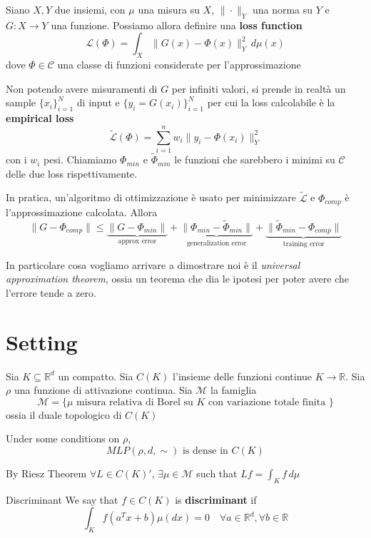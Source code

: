 Siano \(X,Y\) due insiemi, con \(\mu\) una misura su \(X\), \(\|\cdot \|_Y\) una
norma su \(Y\) e \(G:X\to Y\) una funzione. Possiamo allora definire una \textbf{loss function}
\[
  \mathcal{L}{(\Phi)} = \int_X \|G{(x)}-\Phi{(x)}\|^2_Y \,d\mu{(x)}
\]
dove \(\Phi \in \mathcal{C}\) una classe di funzioni considerate per
l'approssimazione

Non potendo avere misuramenti di \(G\) per infiniti valori, si prende in
realtà un sample \(\{x_{i}\}_{i=1} ^{N}\) di input e \(\{y_{i}=G{(x_{i})}\}_{i=1} ^{N}\) per cui la loss calcolabile è la \textbf{empirical loss}
\[
  \tilde{\mathcal{L}}{(\Phi)} = \sum_{i=1}^{n} w_{i} \|y_{i} - \Phi{(x_{i})}\|^2_Y 
\]
con i \(w_{i}\) pesi. Chiamiamo \(\Phi_{min}\) e \(\tilde{\Phi}_{min}\) le
funzioni che sarebbero i minimi su \(\mathcal{C}\) delle due loss
rispettivamente.

In pratica, un'algoritmo di ottimizzazione è usato per minimizzare \(\tilde{\mathcal{L}}\) e \(\Phi_{comp} \) è l'approssimazione calcolata. Allora
\[
    \|G - \Phi_{comp} \| \le \underbrace{\|G-\Phi_{min} \|}_\text{approx error}  + \underbrace{\|\Phi_{min} - \tilde{\Phi}_{min}\|}_\text{generalization error}  + \underbrace{\|\tilde{\Phi}_{min} - \Phi_{comp}\|}_\text{training error} 
\]

In particolare cosa vogliamo arrivare a dimostrare noi è il \emph{universal
approximation theorem}, ossia un teorema che dia le ipotesi per poter avere che
l'errore tende a zero.

\section{Setting}
Sia \(K \subseteq \mathbb{R}^{d} \) un compatto.
Sia \(C{(K)}\) l'insieme delle funzioni continue \(K \to \mathbb{R}\). Sia
\(\rho\)  una funzione di attivazione continua.
Sia \(\mathcal{M}\) la famiglia
\[
  \mathcal{M} = \{\mu \text{ misura relativa di Borel su }K\text{ con variazione
  totale finita }\} 
\]
ossia il duale topologico di \(C{(K)}\) 
\begin{theorem}
    Under some conditions on \(\rho\), 
    \[
      MLP(\rho, d, \sim )\text{ is dense in }C{(K)}
    \]
\end{theorem}

By Riesz Theorem \(\forall L \in C{(K)}'\), \(\exists \mu \in \mathcal{M}\) such
that
\(
  Lf = \int _K f \,d \mu
\)

\begin{definition}{Discriminant}
    We say that \(f \in C{(K)}\) is \textbf{discriminant} if
    \[
      \int _K f{(a^{T}x + b)} \mu{(dx)} = 0 \quad \forall a \in \mathbb{R}^{d},
      \forall b \in \mathbb{R}
    \]
\end{definition}

